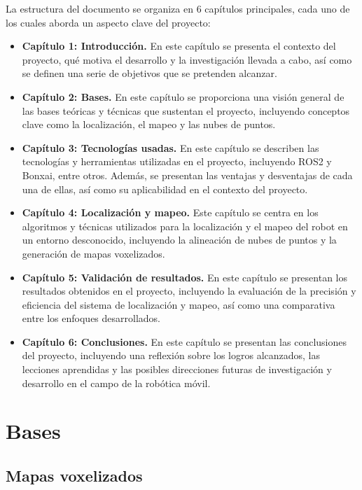\documentclass[12pt, a4paper, twoside]{article}
\begin{document}
La estructura del documento se organiza en 6 capítulos principales, cada uno de los cuales aborda un aspecto clave del proyecto:
\begin{itemize}
  \item \textbf{Capítulo 1: Introducción.} En este capítulo se presenta el contexto del proyecto, qué motiva el 
    desarrollo y la investigación llevada a cabo, así como se definen una serie de objetivos que se pretenden alcanzar.
  \item \textbf{Capítulo 2: Bases.} En este capítulo se proporciona una visión general de las bases teóricas y 
    técnicas que sustentan el proyecto, incluyendo conceptos clave como la localización, el mapeo y las nubes de puntos.
  \item \textbf{Capítulo 3: Tecnologías usadas.} En este capítulo se describen las tecnologías y herramientas utilizadas 
    en el proyecto, incluyendo ROS2 y Bonxai, entre otros. Además, se presentan las ventajas y desventajas de cada una de ellas, 
    así como su aplicabilidad en el contexto del proyecto.
  \item \textbf{Capítulo 4: Localización y mapeo.} Este capítulo se centra en los algoritmos y técnicas utilizados para 
    la localización y el mapeo del robot en un entorno desconocido, incluyendo la alineación de nubes de puntos y la generación 
    de mapas voxelizados.
  \item \textbf{Capítulo 5: Validación de resultados.} En este capítulo se presentan los resultados obtenidos en el proyecto, 
    incluyendo la evaluación de la precisión y eficiencia del sistema de localización y mapeo, así como una comparativa entre 
    los enfoques desarrollados.
  \item \textbf{Capítulo 6: Conclusiones.} En este capítulo se presentan las conclusiones del proyecto, incluyendo una reflexión 
    sobre los logros alcanzados, las lecciones aprendidas y las posibles direcciones futuras de investigación y desarrollo en el 
    campo de la robótica móvil.
\end{itemize}

\newpage

\section{Bases}

\subsection{Mapas voxelizados}
\end{document}
